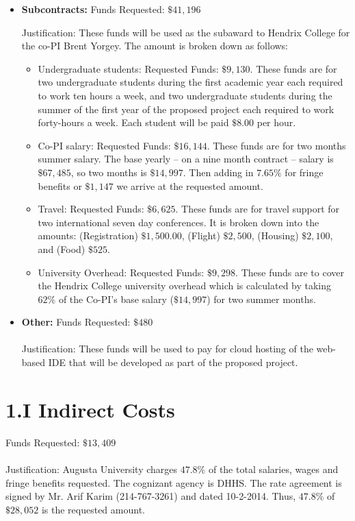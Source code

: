 \documentclass[11pt]{article}
\begin{document}
\begin{itemize}
\item \textbf{Subcontracts:} Funds Requested: $\$41,196$

  Justification: These funds will be used as the subaward to Hendrix
  College for the co-PI Brent Yorgey.  The amount is broken down as
  follows:
  \begin{itemize}
  \item Undergraduate students: Requested Funds: $\$9,130$.  These
    funds are for two undergraduate students during the first academic
    year each required to work ten hours a week, and two undergraduate
    students during the summer of the first year of the proposed
    project each required to work forty-hours a week.  Each student
    will be paid $\$8.00$ per hour.
  \item Co-PI salary: Requested Funds: $\$16,144$.  These funds are
    for two months summer salary. The base yearly -- on a nine month
    contract -- salary is $\$67,485$, so two months is $\$14,997$.
    Then adding in $7.65\%$ for fringe benefits or $\$1,147$ we arrive
    at the requested amount.
  \item Travel: Requested Funds: $\$6,625$.  These funds are for
    travel support for two international seven day conferences. It is
    broken down into the amounts: (Registration) $\$1,500.00$,
    (Flight) $\$2,500$, (Housing) $\$2,100$, and (Food) $\$525$.
  \item University Overhead: Requested Funds: $\$9,298$.  These funds
    are to cover the Hendrix College university overhead which is
    calculated by taking $62\%$ of the Co-PI's base salary
    ($\$14,997$) for two summer months.
  \end{itemize}

\item \textbf{Other:} Funds Requested: $\$480$\\ \ \\ Justification:
  These funds will be used to pay for cloud hosting of the web-based
  IDE that will be developed as part of the proposed project.
\end{itemize}


\section*{1.I Indirect Costs}
\label{sec:1.i_indirect_costs}
Funds Requested: $\$13,409$\\ \ \\ Justification: Augusta University
charges $47.8\%$ of the total salaries, wages and fringe benefits
requested.  The cognizant agency is DHHS.  The rate agreement is
signed by Mr. Arif Karim (214-767-3261) and dated 10-2-2014.  Thus,
$47.8\%$ of $\$28,052$ is the requested amount.
\end{document}
